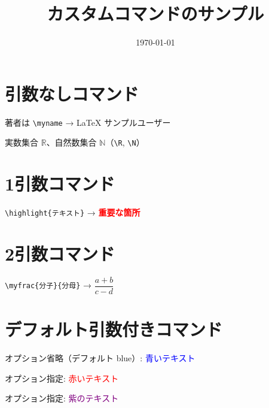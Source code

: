 \documentclass[lualatex,ja=standard]{bxjsarticle}
\title{カスタムコマンドのサンプル}
\author{\myname}
\date{\today}
\newcommand{\myname}{LaTeX サンプルユーザー}
\newcommand{\R}{\mathbb{R}}          %
\newcommand{\N}{\mathbb{N}}          %
\newcommand{\highlight}[1]{\textbf{\textcolor{red}{#1}}}  %
\newcommand{\myfrac}[2]{\dfrac{#1}{#2}}
\newcommand{\colortext}[2][blue]{\textcolor{#1}{#2}}
\begin{document}
\maketitle

\section{引数なしコマンド}

著者は \texttt{\textbackslash myname} → \myname

実数集合 $\R$、自然数集合 $\N$（\texttt{\textbackslash R}, \texttt{\textbackslash N}）

\section{1引数コマンド}

\texttt{\textbackslash highlight\{テキスト\}} → \highlight{重要な箇所}

\section{2引数コマンド}

\texttt{\textbackslash myfrac\{分子\}\{分母\}} → $\myfrac{a+b}{c-d}$

\section{デフォルト引数付きコマンド}

オプション省略（デフォルト blue）: \colortext{青いテキスト}

オプション指定: \colortext[red]{赤いテキスト}

オプション指定: \colortext[purple]{紫のテキスト}

\end{document}
